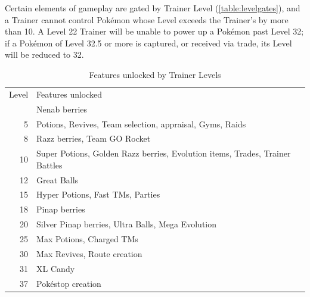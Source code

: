 Certain elements of gameplay are gated by Trainer Level (\autoref{table:levelgates}),
  and a Trainer cannot control Pokémon whose Level exceeds the Trainer's
  by more than 10.
A Level 22 Trainer will be unable to power up a Pokémon past Level 32;
  if a Pokémon of Level 32.5 or more is captured, or received via trade, its
  Level will be reduced to 32.
\begin{table}[ht]
\begin{center}
  \begin{tabular}{r p{}}
  Level & Features unlocked \\
\Midrule
  2 & Nenab berries \\
  5 & Potions, Revives, Team selection, appraisal, Gyms, Raids \\
  8 & Razz berries, Team GO Rocket \\
  10 & Super Potions, Golden Razz berries, Evolution items, Trades, Trainer Battles \\
  12 & Great Balls \\
  15 & Hyper Potions, Fast TMs, Parties \\
  18 & Pinap berries \\
  20 & Silver Pinap berries, Ultra Balls, Mega Evolution \\
  25 & Max Potions, Charged TMs \\
  30 & Max Revives, Route creation \\
  31 & XL Candy \\
  37 & Pokéstop creation \\
\end{tabular}
\caption{Features unlocked by Trainer Levels}
\label{table:levelgates}
\end{center}
\end{table}

